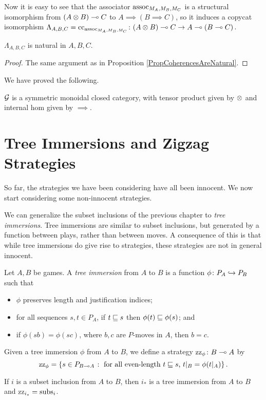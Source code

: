 \documentclass[11pt]{report}
\begin{document}
Now it is easy to see that the associator $\operatorname{assoc}_{M_A,M_B,M_C}$ is a structural isomorphism from $(A\otimes B) \multimap C$ to $A\implies (B\implies C)$, so it induces a copycat isomorphism $\Lambda_{A,B,C}=\operatorname{cc}_{\operatorname{assoc}_{M_A,M_B,M_C}} \colon (A\otimes B) \multimap C \to A \multimap (B\multimap C)$.

\begin{proposition}
  $\Lambda_{A,B,C}$ is natural in $A,B,C$.
\end{proposition}
\begin{proof}
  The same argument as in Proposition \ref{PropCoherencesAreNatural}.
\end{proof}

We have proved the following.

\begin{theorem}
  $\mathcal G$ is a symmetric monoidal closed category, with tensor product given by $\otimes$ and internal hom given by $\implies$.
\end{theorem}

\section{Tree Immersions and Zigzag Strategies}

So far, the strategies we have been considering have all been innocent.  
We now start considering some non-innocent strategies.

We can generalize the subset inclusions of the previous chapter to \emph{tree immersions}.  
Tree immersions are similar to subset inclusions, but generated by a function between plays, rather than between moves.  
A consequence of this is that while tree immersions do give rise to strategies, these strategies are not in general innocent.

\begin{definition}
  Let $A,B$ be games.  
  A \emph{tree immersion} from $A$ to $B$ is a function $\phi\colon P_A \hookrightarrow P_B$ such that
  \begin{itemize}
    \item $\phi$ preserves length and justification indices; 
    \item for all sequences $s,t\in P_A$, if $t\sqsubseteq s$ then $\phi(t)\sqsubseteq\phi(s)$; and
    \item if $\phi(sb)=\phi(sc)$, where $b,c$ are $P$-moves in $A$, then $b=c$.
  \end{itemize}

  Given a tree immersion $\phi$ from $A$ to $B$, we define a strategy $\operatorname{zz}_\phi\colon B \multimap A$ by
  \[
    \operatorname{zz}_\phi = \{s\in P_{B\multimap A}\;\colon\;\text{for all even-length $t\sqsubseteq s$, $t\vert_B=\phi(t\vert_A)$}\}\,.
    \]
\end{definition}
\begin{example}
  If $i$ is a subset inclusion from $A$ to $B$, then $i_*$ is a tree immersion from $A$ to $B$ and $\operatorname{zz}_{i_*}=\operatorname{subs}_i$.
\end{example}
\end{document}
